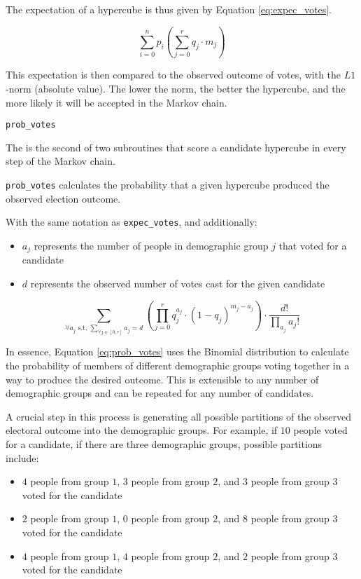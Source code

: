 The expectation of a hypercube is thus given by Equation \ref{eq:expec_votes}.

\begin{equation}
 \sum_{i = 0}^n p_i \left(\sum_{j = 0}^r q_j \cdot m_j\right)
 \label{eq:expec_votes}
\end{equation}

This expectation is then compared to the observed outcome of votes, with the $L1$-norm (absolute value). The lower the norm, the better the hypercube, and the more likely it will be accepted in the Markov chain.


\texttt{prob\_votes}


The is the second of two subroutines that score a candidate hypercube in every step of the Markov chain.

\texttt{prob\_votes} calculates the probability that a given hypercube produced the observed election outcome.

With the same notation as \texttt{expec\_votes}, and additionally:

\begin{itemize}
  \item $a_j$ represents the number of people in demographic group $j$ that voted for a candidate
  \item $d$ represents the observed number of votes cast for the given candidate
\end{itemize}

\begin{equation}
 \sum_{\forall a_j \text{ s.t. } \sum_{\forall j \in [0, r]} a_j = d} \left(\prod_{j = 0}^r q_j^{a_j} \cdot (1 - q_j)^{m_j - a_j}\right) \cdot \frac{d!}{\prod_{a_j}a_j!}
 \label{eq:prob_votes}
\end{equation}

In essence, Equation \ref{eq:prob_votes} uses the Binomial distribution to calculate the probability of members of different demographic groups voting together in a way to produce the desired outcome. This is extensible to any number of demographic groups and can be repeated for any number of candidates.

A crucial step in this process is generating all possible partitions of the observed electoral outcome into the demographic groups. For example, if $10$ people voted for a candidate, if there are three demographic groups, possible partitions include:

\begin{itemize}
  \item $4$ people from group $1$, $3$ people from group $2$, and $3$ people from group $3$ voted for the candidate
  \item $2$ people from group $1$, $0$ people from group $2$, and $8$ people from group $3$ voted for the candidate
  \item $4$ people from group $1$, $4$ people from group $2$, and $2$ people from group $3$ voted for the candidate
\end{itemize}

